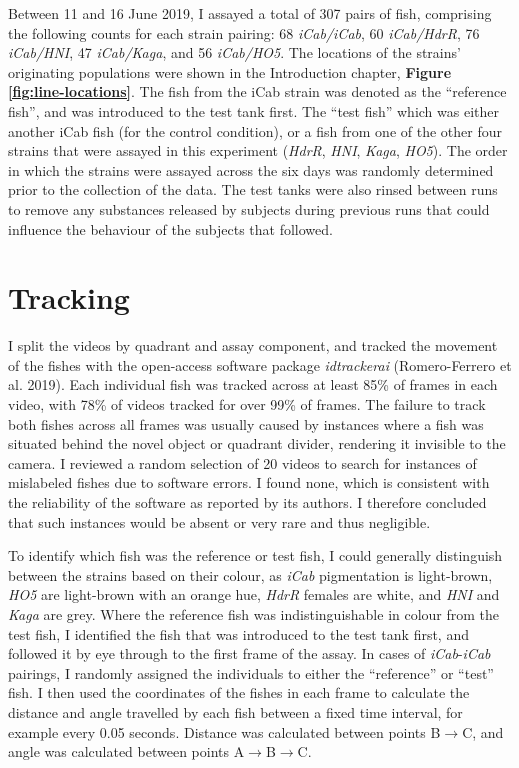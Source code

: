 \documentclass[
]{book}
\begin{document}
Between 11 and 16 June 2019, I assayed a total of 307 pairs of fish, comprising the following counts for each strain pairing: 68 \emph{iCab/iCab}, 60 \emph{iCab/HdrR}, 76 \emph{iCab/HNI}, 47 \emph{iCab/Kaga}, and 56 \emph{iCab/HO5}. The locations of the strains' originating populations were shown in the Introduction chapter, \textbf{Figure \ref{fig:line-locations}}. The fish from the iCab strain was denoted as the ``reference fish'', and was introduced to the test tank first. The ``test fish'' which was either another iCab fish (for the control condition), or a fish from one of the other four strains that were assayed in this experiment (\emph{HdrR}, \emph{HNI}, \emph{Kaga}, \emph{HO5}). The order in which the strains were assayed across the six days was randomly determined prior to the collection of the data. The test tanks were also rinsed between runs to remove any substances released by subjects during previous runs that could influence the behaviour of the subjects that followed.

\hypertarget{tracking}{%
\section{Tracking}\label{tracking}}

I split the videos by quadrant and assay component, and tracked the movement of the fishes with the open-access software package \emph{idtrackerai} (Romero-Ferrero et al. 2019). Each individual fish was tracked across at least 85\% of frames in each video, with 78\% of videos tracked for over 99\% of frames. The failure to track both fishes across all frames was usually caused by instances where a fish was situated behind the novel object or quadrant divider, rendering it invisible to the camera. I reviewed a random selection of 20 videos to search for instances of mislabeled fishes due to software errors. I found none, which is consistent with the reliability of the software as reported by its authors. I therefore concluded that such instances would be absent or very rare and thus negligible.

To identify which fish was the reference or test fish, I could generally distinguish between the strains based on their colour, as \emph{iCab} pigmentation is light-brown, \emph{HO5} are light-brown with an orange hue, \emph{HdrR} females are white, and \emph{HNI} and \emph{Kaga} are grey. Where the reference fish was indistinguishable in colour from the test fish, I identified the fish that was introduced to the test tank first, and followed it by eye through to the first frame of the assay. In cases of \emph{iCab}-\emph{iCab} pairings, I randomly assigned the individuals to either the ``reference'' or ``test'' fish. I then used the coordinates of the fishes in each frame to calculate the distance and angle travelled by each fish between a fixed time interval, for example every 0.05 seconds. Distance was calculated between points B\(\rightarrow\)C, and angle was calculated between points A\(\rightarrow\)B\(\rightarrow\)C.
\end{document}
